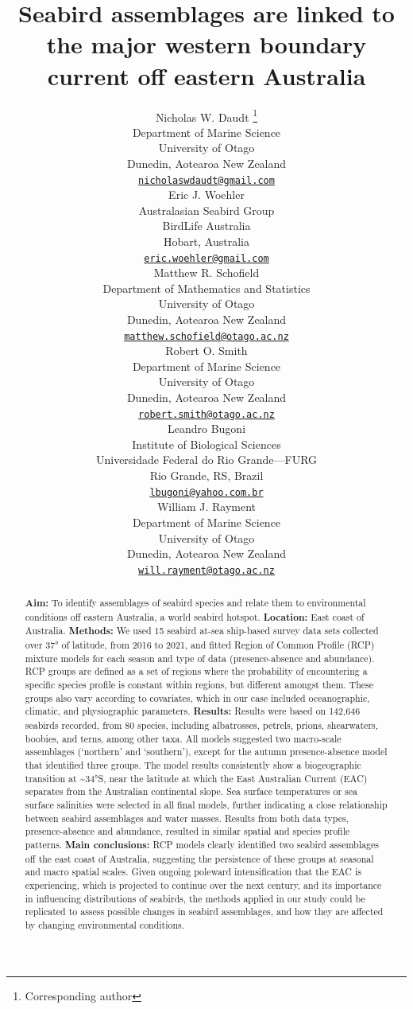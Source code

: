 \documentclass{article}
\title{Seabird assemblages are linked to the major western boundary current off eastern Australia}
\author{
    Nicholas W. Daudt
    \thanks{Corresponding author}
   \\
    Department of Marine Science \\
    University of Otago \\
  Dunedin, Aotearoa New Zealand \\
  \texttt{\href{mailto:nicholaswdaudt@gmail.com}{\nolinkurl{nicholaswdaudt@gmail.com}}} \\
   \And
    Eric J. Woehler
   \\
    Australasian Seabird Group \\
    BirdLife Australia \\
  Hobart, Australia \\
  \texttt{\href{mailto:eric.woehler@gmail.com}{\nolinkurl{eric.woehler@gmail.com}}} \\
   \And
    Matthew R. Schofield
   \\
    Department of Mathematics and Statistics \\
    University of Otago \\
  Dunedin, Aotearoa New Zealand \\
  \texttt{\href{mailto:matthew.schofield@otago.ac.nz}{\nolinkurl{matthew.schofield@otago.ac.nz}}} \\
   \And
    Robert O. Smith
   \\
    Department of Marine Science \\
    University of Otago \\
  Dunedin, Aotearoa New Zealand \\
  \texttt{\href{mailto:robert.smith@otago.ac.nz}{\nolinkurl{robert.smith@otago.ac.nz}}} \\
   \And
    Leandro Bugoni
   \\
    Institute of Biological Sciences \\
    Universidade Federal do Rio Grande---FURG \\
  Rio Grande, RS, Brazil \\
  \texttt{\href{mailto:lbugoni@yahoo.com.br}{\nolinkurl{lbugoni@yahoo.com.br}}} \\
   \And
    William J. Rayment
   \\
    Department of Marine Science \\
    University of Otago \\
  Dunedin, Aotearoa New Zealand \\
  \texttt{\href{mailto:will.rayment@otago.ac.nz}{\nolinkurl{will.rayment@otago.ac.nz}}} \\
  }
\begin{document}
\maketitle


\begin{abstract}
\textbf{Aim:} To identify assemblages of seabird species and relate them to environmental conditions off eastern Australia, a world seabird hotspot.
\textbf{Location:} East coast of Australia.
\textbf{Methods:} We used 15 seabird at-sea ship-based survey data sets collected over 37° of latitude, from 2016 to 2021, and fitted Region of Common Profile (RCP) mixture models for each season and type of data (presence-absence and abundance). RCP groups are defined as a set of regions where the probability of encountering a specific species profile is constant within regions, but different amongst them. These groups also vary according to covariates, which in our case included oceanographic, climatic, and physiographic parameters.
\textbf{Results:} Results were based on 142,646 seabirds recorded, from 80 species, including albatrosses, petrels, prions, shearwaters, boobies, and terns, among other taxa. All models suggested two macro-scale assemblages (`northern' and `southern'), except for the autumn presence-absence model that identified three groups. The model results consistently show a biogeographic transition at \textasciitilde34°S, near the latitude at which the East Australian Current (EAC) separates from the Australian continental slope. Sea surface temperatures or sea surface salinities were selected in all final models, further indicating a close relationship between seabird assemblages and water masses. Results from both data types, presence-absence and abundance, resulted in similar spatial and species profile patterns.
\textbf{Main conclusions:} RCP models clearly identified two seabird assemblages off the east coast of Australia, suggesting the persistence of these groups at seasonal and macro spatial scales. Given ongoing poleward intensification that the EAC is experiencing, which is projected to continue over the next century, and its importance in influencing distributions of seabirds, the methods applied in our study could be replicated to assess possible changes in seabird assemblages, and how they are affected by changing environmental conditions.
\end{abstract}

\end{document}
